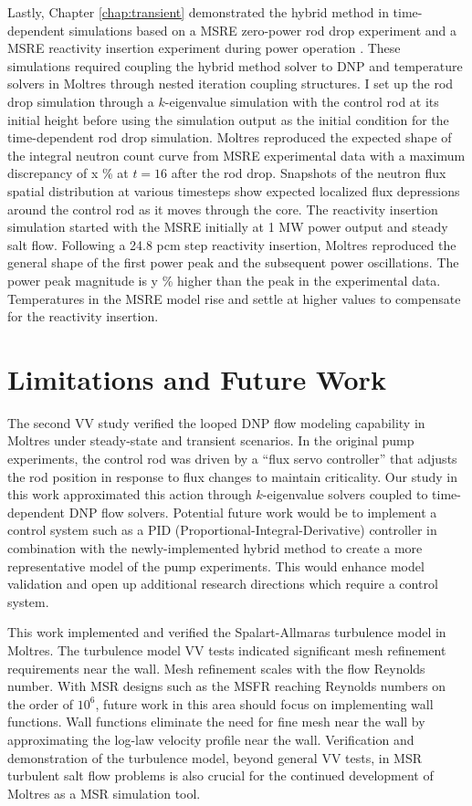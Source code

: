 Lastly, Chapter \ref{chap:transient} demonstrated the hybrid method in time-dependent simulations
based on a \gls{MSRE} zero-power rod drop experiment \cite{prince_zero-power_1968} and a \gls{MSRE}
reactivity insertion experiment during power operation \cite{steffy_experimental_1970}. These
simulations required coupling the hybrid method solver to \gls{DNP} and temperature solvers in
Moltres through nested iteration coupling structures. I set up the rod drop simulation through a
$k$-eigenvalue simulation with the control rod at its initial height before using the simulation
output as the initial condition for the time-dependent rod drop simulation. Moltres reproduced the
expected shape of the integral neutron count curve from \gls{MSRE} experimental data with a maximum
discrepancy of x \% at $t=16$ after the rod drop. Snapshots of the neutron flux spatial
distribution at various timesteps show expected localized flux depressions around the control rod
as it moves through the core.
The reactivity insertion simulation started with the \gls{MSRE} initially at 1 MW power output and
steady salt flow. Following a 24.8 pcm step reactivity insertion, Moltres reproduced the general
shape of the first power peak and the subsequent power oscillations. The power peak magnitude
is y \% higher than the peak in the experimental data. Temperatures in the \gls{MSRE} model rise
and settle at higher values to compensate for the reactivity insertion.

\section{Limitations and Future Work}

The second \gls{VV} study verified the looped \gls{DNP} flow modeling capability in Moltres under
steady-state and transient scenarios. In the original pump experiments, the control rod was driven
by a ``flux servo controller'' that adjusts the rod position in response to flux changes to maintain
criticality. Our study in this work approximated this action through $k$-eigenvalue solvers
coupled to time-dependent \gls{DNP} flow solvers. Potential future work would be to implement a
control system such as a PID (Proportional-Integral-Derivative) controller in combination with
the newly-implemented hybrid method to create a more representative model of the pump experiments.
This would enhance model validation and open up additional research directions which require a
control system.

This work implemented and verified the Spalart-Allmaras turbulence model in Moltres. The turbulence
model \gls{VV} tests indicated significant mesh refinement requirements near the wall. Mesh
refinement scales with the flow Reynolds number. With \gls{MSR} designs such as the \gls{MSFR}
reaching Reynolds numbers on the order of $10^6$, future work in this area should focus on
implementing wall functions. Wall functions eliminate the need for fine mesh near the wall by
approximating the log-law velocity profile near the wall. Verification and demonstration of the
turbulence model, beyond general \gls{VV} tests, in \gls{MSR} turbulent salt flow problems is also
crucial for the continued development of Moltres as a \gls{MSR} simulation tool.

